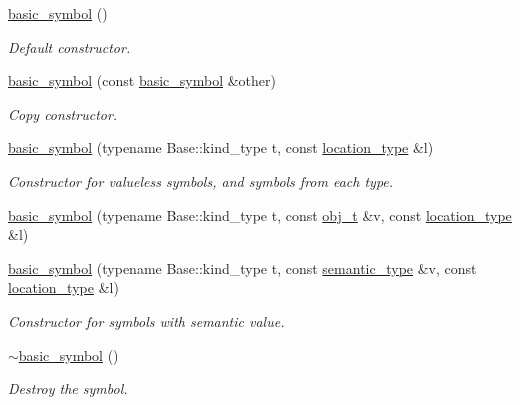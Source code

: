 \begin{DoxyCompactItemize}
\item 
\hyperlink{structyy_1_1genesyspp__parser_1_1basic__symbol_ac749c8aa9c095dca4f6455cb91c8a90d}{basic\-\_\-symbol} ()
\begin{DoxyCompactList}\small\item\em Default constructor. \end{DoxyCompactList}\item 
\hyperlink{structyy_1_1genesyspp__parser_1_1basic__symbol_a9675a48bfdda3c3c4d3937124740dac4}{basic\-\_\-symbol} (const \hyperlink{structyy_1_1genesyspp__parser_1_1basic__symbol}{basic\-\_\-symbol} \&other)
\begin{DoxyCompactList}\small\item\em Copy constructor. \end{DoxyCompactList}\item 
\hyperlink{structyy_1_1genesyspp__parser_1_1basic__symbol_a9f10b31e1972d8e8956baff9aa2640e9}{basic\-\_\-symbol} (typename Base\-::kind\-\_\-type t, const \hyperlink{classyy_1_1genesyspp__parser_aa0276d3782ebff157827ad5e7d44f97c}{location\-\_\-type} \&l)
\begin{DoxyCompactList}\small\item\em Constructor for valueless symbols, and symbols from each type. \end{DoxyCompactList}\item 
\hyperlink{structyy_1_1genesyspp__parser_1_1basic__symbol_af2a91dccb375a9bc1fb9bb11c7d5907d}{basic\-\_\-symbol} (typename Base\-::kind\-\_\-type t, const \hyperlink{classobj__t}{obj\-\_\-t} \&v, const \hyperlink{classyy_1_1genesyspp__parser_aa0276d3782ebff157827ad5e7d44f97c}{location\-\_\-type} \&l)
\item 
\hyperlink{structyy_1_1genesyspp__parser_1_1basic__symbol_a94529fa808d843d97fad2b531bd04466}{basic\-\_\-symbol} (typename Base\-::kind\-\_\-type t, const \hyperlink{classyy_1_1genesyspp__parser_a592978b9aaaa0d61f9faf4093f5f554d}{semantic\-\_\-type} \&v, const \hyperlink{classyy_1_1genesyspp__parser_aa0276d3782ebff157827ad5e7d44f97c}{location\-\_\-type} \&l)
\begin{DoxyCompactList}\small\item\em Constructor for symbols with semantic value. \end{DoxyCompactList}\item 
\hyperlink{structyy_1_1genesyspp__parser_1_1basic__symbol_aeaa054339c41c834ec30bbda4dc3beff}{$\sim$basic\-\_\-symbol} ()
\begin{DoxyCompactList}\small\item\em Destroy the symbol. \end{DoxyCompactList}\item 

\end{DoxyCompactItemize}
